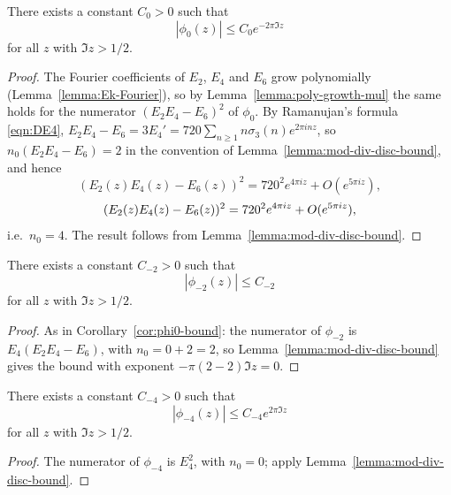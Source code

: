 \begin{corollary}\label{cor:phi0-bound}
There exists a constant $C_0 > 0$ such that
\begin{equation}\label{eqn:phi0-bound}
|\phi_0(z)| \le C_0 e^{-2 \pi \Im z}
\end{equation}
for all $z$ with $\Im z > 1/2$.
\end{corollary}
\begin{proof}
The Fourier coefficients of $E_2$, $E_4$ and $E_6$ grow polynomially (Lemma~\ref{lemma:Ek-Fourier}), so by Lemma~\ref{lemma:poly-growth-mul} the same holds for the numerator $(E_2E_4 - E_6)^2$ of $\phi_0$. By Ramanujan's formula \eqref{eqn:DE4}, $E_2 E_4 - E_6 = 3E_4' = 720 \sum_{n \ge 1} n \sigma_3(n) e^{2 \pi i n z}$, so $n_0(E_2E_4 - E_6) = 2$ in the convention of Lemma~\ref{lemma:mod-div-disc-bound}, and hence
\ifplastex
\begin{equation*}
    (E_2(z) E_4(z) - E_6(z))^{2} = 720^{2} e^{4 \pi i z} + O(e^{5 \pi i z}),
\end{equation*}
\else
\begin{equation}
    (E_2(z) E_4(z) - E_6(z))^{2} = 720^{2} e^{4 \pi i z} + O(e^{5 \pi i z}), \notag
\end{equation}
\fi
i.e.\ $n_0 = 4$. The result follows from Lemma~\ref{lemma:mod-div-disc-bound}.
\end{proof}

\begin{corollary}\label{cor:phi2-bound}
There exists a constant $C_{-2} > 0$ such that
\begin{equation}\label{eqn:phi2-bound}
    |\phi_{-2}(z)| \le C_{-2}
\end{equation}
for all $z$ with $\Im z > 1/2$.
\end{corollary}
\begin{proof}
As in Corollary~\ref{cor:phi0-bound}: the numerator of $\phi_{-2}$ is $E_4(E_2E_4 - E_6)$, with $n_0 = 0 + 2 = 2$, so Lemma~\ref{lemma:mod-div-disc-bound} gives the bound with exponent $-\pi(2-2)\Im z = 0$.
\end{proof}

\begin{corollary}\label{cor:phi4-bound}
There exists a constant $C_{-4} > 0$ such that
\begin{equation}\label{eqn:phi4-bound}
    |\phi_{-4}(z)| \le C_{-4} e^{2 \pi \Im z}
\end{equation}
for all $z$ with $\Im z > 1/2$.
\end{corollary}
\begin{proof}
The numerator of $\phi_{-4}$ is $E_4^2$, with $n_0 = 0$; apply Lemma~\ref{lemma:mod-div-disc-bound}.
\end{proof}

